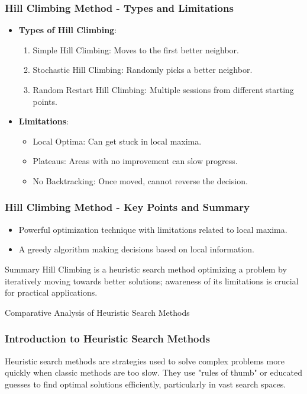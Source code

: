 \documentclass[aspectratio=169]{beamer}
\begin{document}
\begin{frame}[fragile]
    \frametitle{Hill Climbing Method - Types and Limitations}
    \begin{itemize}
        \item \textbf{Types of Hill Climbing}:
        \begin{enumerate}
            \item Simple Hill Climbing: Moves to the first better neighbor.
            \item Stochastic Hill Climbing: Randomly picks a better neighbor.
            \item Random Restart Hill Climbing: Multiple sessions from different starting points.
        \end{enumerate}
        
        \item \textbf{Limitations}:
        \begin{itemize}
            \item Local Optima: Can get stuck in local maxima.
            \item Plateaus: Areas with no improvement can slow progress.
            \item No Backtracking: Once moved, cannot reverse the decision.
        \end{itemize}
    \end{itemize}
\end{frame}

\begin{frame}[fragile]
    \frametitle{Hill Climbing Method - Key Points and Summary}
    \begin{itemize}
        \item Powerful optimization technique with limitations related to local maxima.
        \item A greedy algorithm making decisions based on local information.
    \end{itemize}
    \begin{block}{Summary}
        Hill Climbing is a heuristic search method optimizing a problem by iteratively moving towards better solutions; awareness of its limitations is crucial for practical applications.
    \end{block}
\end{frame}

\begin{frame}[fragile]{Comparative Analysis of Heuristic Search Methods}
    \frametitle{Introduction to Heuristic Search Methods}
    Heuristic search methods are strategies used to solve complex problems more quickly when classic methods are too slow. They use "rules of thumb" or educated guesses to find optimal solutions efficiently, particularly in vast search spaces.
\end{frame}
\end{document}
